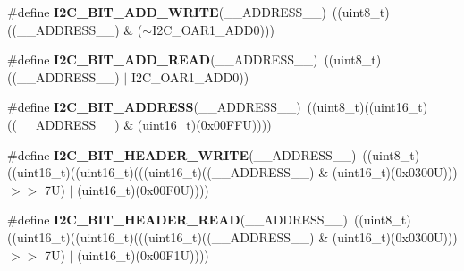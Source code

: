 \begin{DoxyCompactItemize}
\item 
\mbox{\label{group___i2_c___private___macros_gad83949bd18eca67258b05763a90d0128}} 
\#define {\bfseries I2\+C\+\_\+B\+I\+T\+\_\+\+A\+D\+D\+\_\+\+W\+R\+I\+TE}(\+\_\+\+\_\+\+A\+D\+D\+R\+E\+S\+S\+\_\+\+\_\+)~((uint8\+\_\+t)((\+\_\+\+\_\+\+A\+D\+D\+R\+E\+S\+S\+\_\+\+\_\+) \& ($\sim$I2\+C\+\_\+\+O\+A\+R1\+\_\+\+A\+D\+D0)))
\item 
\mbox{\label{group___i2_c___private___macros_gacec6f0d6fde48a24327d2db15387fed8}} 
\#define {\bfseries I2\+C\+\_\+B\+I\+T\+\_\+\+A\+D\+D\+\_\+\+R\+E\+AD}(\+\_\+\+\_\+\+A\+D\+D\+R\+E\+S\+S\+\_\+\+\_\+)~((uint8\+\_\+t)((\+\_\+\+\_\+\+A\+D\+D\+R\+E\+S\+S\+\_\+\+\_\+) $\vert$ I2\+C\+\_\+\+O\+A\+R1\+\_\+\+A\+D\+D0))
\item 
\mbox{\label{group___i2_c___private___macros_ga51ad2b93ef13577d3d437507e09191cd}} 
\#define {\bfseries I2\+C\+\_\+B\+I\+T\+\_\+\+A\+D\+D\+R\+E\+SS}(\+\_\+\+\_\+\+A\+D\+D\+R\+E\+S\+S\+\_\+\+\_\+)~((uint8\+\_\+t)((uint16\+\_\+t)((\+\_\+\+\_\+\+A\+D\+D\+R\+E\+S\+S\+\_\+\+\_\+) \& (uint16\+\_\+t)(0x00\+F\+F\+U))))
\item 
\mbox{\label{group___i2_c___private___macros_ga0edd591eaa2ce5511148bf1ebf533e1a}} 
\#define {\bfseries I2\+C\+\_\+B\+I\+T\+\_\+\+H\+E\+A\+D\+E\+R\+\_\+\+W\+R\+I\+TE}(\+\_\+\+\_\+\+A\+D\+D\+R\+E\+S\+S\+\_\+\+\_\+)~((uint8\+\_\+t)((uint16\+\_\+t)((uint16\+\_\+t)(((uint16\+\_\+t)((\+\_\+\+\_\+\+A\+D\+D\+R\+E\+S\+S\+\_\+\+\_\+) \& (uint16\+\_\+t)(0x0300\+U))) $>$$>$ 7\+U) $\vert$ (uint16\+\_\+t)(0x00\+F0\+U))))
\item 
\mbox{\label{group___i2_c___private___macros_ga8d833802aafa40a959f62965e498108c}} 
\#define {\bfseries I2\+C\+\_\+B\+I\+T\+\_\+\+H\+E\+A\+D\+E\+R\+\_\+\+R\+E\+AD}(\+\_\+\+\_\+\+A\+D\+D\+R\+E\+S\+S\+\_\+\+\_\+)~((uint8\+\_\+t)((uint16\+\_\+t)((uint16\+\_\+t)(((uint16\+\_\+t)((\+\_\+\+\_\+\+A\+D\+D\+R\+E\+S\+S\+\_\+\+\_\+) \& (uint16\+\_\+t)(0x0300\+U))) $>$$>$ 7\+U) $\vert$ (uint16\+\_\+t)(0x00\+F1\+U))))
\item 
\mbox{\label{group___i2_c___private___macros_ga2e42fa55be22240dc5a54a0304d01cfb}} 

\end{DoxyCompactItemize}
